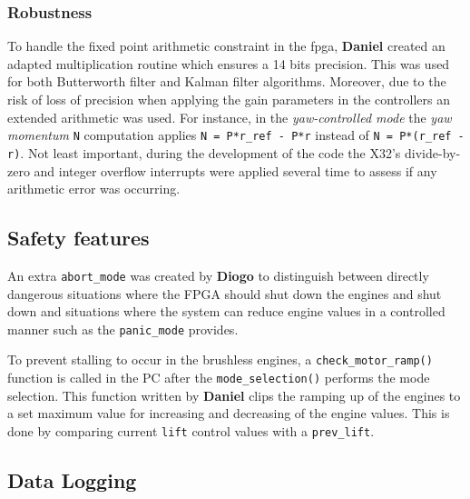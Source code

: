 \documentclass{article}
\begin{document}
\subsubsection{Robustness}
To handle the fixed point arithmetic constraint in the fpga, \textbf{Daniel} created an adapted multiplication routine which ensures a 14 bits precision. This was used for both Butterworth filter and Kalman filter algorithms. Moreover, due to the risk of loss of precision when applying the gain parameters in the controllers an extended   arithmetic was used. For instance, in the \textit{yaw-controlled mode} the \textit{yaw momentum} \texttt{N} computation applies \texttt{N = P*r\_ref - P*r} instead of \texttt{N = P*(r\_ref - r)}.
Not least important, during the development of the code the X32's divide-by-zero and integer overflow interrupts were applied several time to assess if any arithmetic error was occurring.

\subsection{Safety features}
An extra \texttt{abort\_mode} was created by \textbf{Diogo} to distinguish between directly dangerous situations where the FPGA should shut down the engines and shut down and situations where the system can reduce engine values in a controlled manner such as the \texttt{panic\_mode} provides.

To prevent stalling to occur in the brushless engines, a \texttt{check\_motor\_ramp()} function is called in the PC after the \texttt{mode\_selection()} performs the mode selection. This function written by \textbf{Daniel} clips the ramping up of the engines to a set maximum value for increasing and decreasing of the engine values. This is done by comparing current \texttt{lift} control values with a \texttt{prev\_lift}. 

\subsection{Data Logging}
\end{document}
